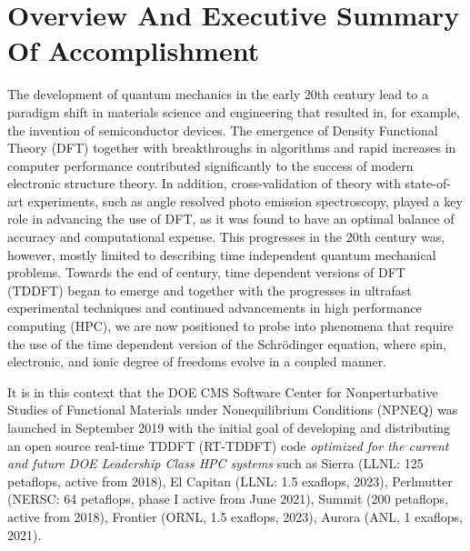 \section{Overview And Executive Summary Of Accomplishment}
\label{sec:overview}

The development of quantum mechanics in the early 20th century lead to a paradigm shift in materials science and engineering that resulted in, for example, the invention of semiconductor devices. The emergence of Density Functional Theory (DFT) together with breakthroughs in algorithms \cite{Cooley1965,Martin1988} and rapid increases in computer performance contributed significantly to the success of modern electronic structure theory. In addition, cross-validation of theory with state-of-art experiments, such as angle resolved photo emission spectroscopy, played a key role in advancing the use of DFT, as it was found to have an optimal balance of accuracy and computational expense. This progresses in the 20th century was, however, mostly limited to describing time independent quantum mechanical problems. Towards the end of century, time dependent versions of DFT (TDDFT) began to emerge \cite{RungeGross1984} and together with the progresses in ultrafast experimental techniques and continued advancements in high performance computing (HPC), we are now positioned to probe into phenomena that require the use of the time dependent version of the Schr\"{o}dinger equation, where spin, electronic, and ionic degree of freedoms evolve in a coupled manner. 

It is in this context that the DOE CMS Software Center for Nonperturbative Studies of Functional Materials under Nonequilibrium Conditions (NPNEQ) was launched in September 2019 with the initial goal of developing and distributing an open source real-time TDDFT (RT-TDDFT) code {\it optimized for the current and future DOE Leadership Class HPC systems} such as Sierra (LLNL: 125 petaflops, active from 2018), El Capitan (LLNL: 1.5 exaflops, 2023), Perlmutter (NERSC: 64 petaflops, phase I active from June 2021), Summit (200 petaflops, active from 2018), Frontier (ORNL, 1.5 exaflops, 2023), Aurora (ANL, 1 exaflops, 2021). 

